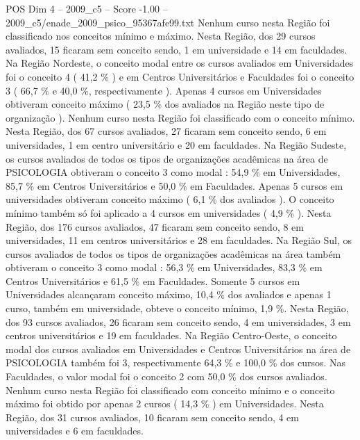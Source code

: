 \begin{textsample}{POS Dim 4 – 2009\_c5 – Score -1.00 – 2009\_c5/enade\_2009\_psico\_95367afe99.txt}
Nenhum curso nesta Região foi classificado nos conceitos mínimo e máximo.
Nesta Região, dos 29 cursos avaliados, 15 ficaram sem conceito sendo, 1 em universidade e 14 em faculdades.
Na Região Nordeste, o conceito modal entre os cursos avaliados em Universidades foi o conceito 4 ( 41,2 \% ) e em Centros Universitários e Faculdades foi o conceito 3 ( 66,7 \% e 40,0 \%, respectivamente ).
Apenas 4 cursos em Universidades obtiveram conceito máximo ( 23,5 \% dos avaliados na Região neste tipo de organização ).
Nenhum curso nesta Região foi classificado com o conceito mínimo.
Nesta Região, dos 67 cursos avaliados, 27 ficaram sem conceito sendo, 6 em universidades, 1 em centro universitário e 20 em faculdades.
Na Região Sudeste, os cursos avaliados de todos os tipos de organizações acadêmicas na área de PSICOLOGIA obtiveram o conceito 3 como modal : 54,9 \% em Universidades, 85,7 \% em Centros Universitários e 50,0 \% em Faculdades.
Apenas 5 cursos em universidades obtiveram conceito máximo ( 6,1 \% dos avaliados ).
O conceito mínimo também só foi aplicado a 4 cursos em universidades ( 4,9 \% ).
Nesta Região, dos 176 cursos avaliados, 47 ficaram sem conceito sendo, 8 em universidades, 11 em centros universitários e 28 em faculdades.
Na Região Sul, os cursos avaliados de todos os tipos de organizações acadêmicas na área também obtiveram o conceito 3 como modal : 56,3 \% em Universidades, 83,3 \% em Centros Universitários e 61,5 \% em Faculdades.
Somente 5 cursos em Universidades alcançaram conceito máximo, 10,4 \% dos avaliados e apenas 1 curso, também em universidade, obteve o conceito mínimo, 1,9 \%.
Nesta Região, dos 93 cursos avaliados, 26 ficaram sem conceito sendo, 4 em universidades, 3 em centros universitários e 19 em faculdades.
Na Região Centro-Oeste, o conceito modal dos cursos avaliados em Universidades e Centros Universitários na área de PSICOLOGIA também foi 3, respectivamente 64,3 \% e 100,0 \% dos cursos.
Nas Faculdades, o valor modal foi o conceito 2 com 50,0 \% dos cursos avaliados.
Nenhum curso nesta Região foi classificado com conceito mínimo e o conceito máximo foi obtido por apenas 2 cursos ( 14,3 \% ) em Universidades.
Nesta Região, dos 31 cursos avaliados, 10 ficaram sem conceito sendo, 4 em universidades e 6 em faculdades.

\end{textsample}
